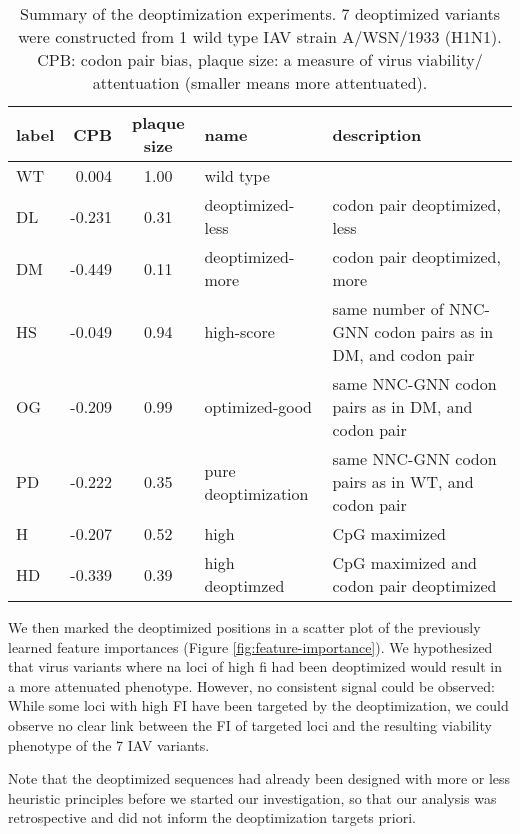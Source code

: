 \begin{table}[htbp]
    \centering
    \begin{tabularx}{\textwidth}{l | r | c | l | X}
        label & CPB & plaque size & name & description \\
        \hline
        WT & 0.004 & 1.00 & wild type & \\
        DL & -0.231 & 0.31 & deoptimized-less & codon pair deoptimized, less \\
        DM & -0.449 & 0.11 & deoptimized-more & codon pair deoptimized, more \\
        HS & -0.049 & 0.94 & high-score & same number of NNC-GNN codon pairs as in DM, and codon pair \\
        OG & -0.209 & 0.99 & optimized-good & same NNC-GNN codon pairs as in DM, and codon pair \\
        PD & -0.222 & 0.35 & pure deoptimization & same NNC-GNN codon pairs as in WT, and codon pair \\
        H & -0.207 & 0.52 & high & CpG maximized \\
        HD & -0.339 & 0.39 & high deoptimzed & CpG maximized and codon pair deoptimized \\
    \end{tabularx}
    \caption[Summary of deoptimized sequences.]{Summary of the deoptimization experiments. 7 deoptimized variants were constructed from 1 wild type IAV strain A/WSN/1933 (H1N1). CPB: codon pair bias, plaque size: a measure of virus viability/ attentuation (smaller means more attentuated).}
    \label{tab:deopt-experiments}
\end{table}


We then marked the deoptimized positions in a scatter plot of the previously learned feature importances (Figure \ref{fig:feature-importance}). We hypothesized that virus variants where \gls{na} loci of high \gls{fi} had been deoptimized would result in a more attenuated phenotype. However, no consistent signal could be observed: While some loci with high FI have been targeted by the deoptimization, we could observe no clear link between the FI of targeted loci and the resulting viability phenotype of the 7 IAV variants.

Note that the deoptimized sequences had already been designed with more or less heuristic principles before we started our investigation, so that our analysis was retrospective and did not inform the deoptimization targets priori.


